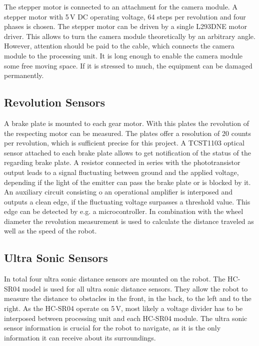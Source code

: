 The stepper motor is connected to an attachment for the camera module. A stepper motor with 5\,V DC operating voltage, 64 steps per revolution and four phases is chosen. The stepper motor can be driven by a single L293DNE motor driver. This allows to turn the camera module theoretically by an arbitrary angle. However, attention should be paid to the cable, which connects the camera module to the processing unit. It is long enough to enable the camera module some free moving space. If it is stressed to much, the equipment can be damaged permanently. 

\subsection{Revolution Sensors}\label{subsec:revolution_sensor}

A brake plate is mounted to each gear motor. With this plates the revolution of the respecting motor can be measured. The plates offer a resolution of 20 counts per revolution, which is sufficient precise for this project. A TCST1103 \cite{tcst1103} optical sensor attached to each brake plate allows to get notification of the status of the regarding brake plate. A resistor connected in series with the phototransistor output leads to a signal fluctuating between ground and the applied voltage, depending if the light of the emitter can pass the brake plate or is blocked by it. An auxiliary circuit consisting o an operational amplifier is interposed and outputs a clean edge, if the fluctuating voltage surpasses a threshold value. This edge can be detected by e.g. a microcontroller. In combination with the wheel diameter the revolution measurement is used to calculate the distance traveled as well as the speed of the robot.

\subsection{Ultra Sonic Sensors}\label{subsec:ultra_sonic_sensor}

In total four ultra sonic distance sensors are mounted on the robot. The HC-SR04 \cite{hc_sr04} model is used for all ultra sonic distance sensors. They allow the robot to measure the distance to obstacles in the front, in the back, to the left and to the right. As the HC-SR04 operate on 5\,V, most likely a voltage divider has to be interposed between processing unit and each HC-SR04 module. The ultra sonic sensor information is crucial for the robot to navigate, as it is the only information it can receive about its surroundings.

